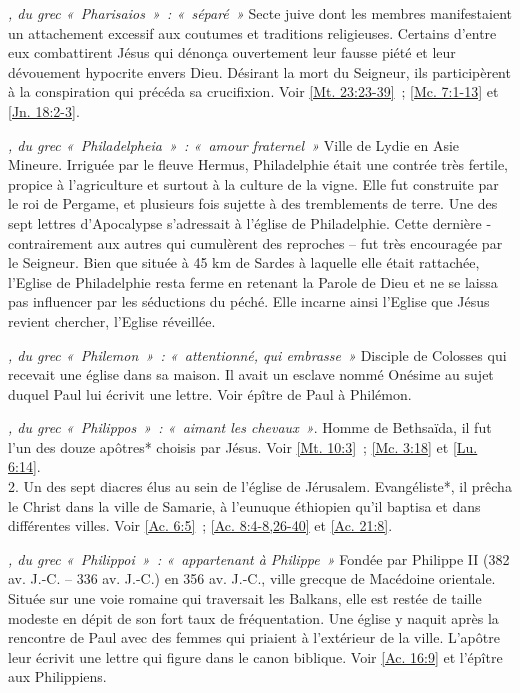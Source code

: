\begin{multicols}{2}
\textit{, du grec «~Pharisaios~»~: «~séparé~»}\newline
Secte juive dont les membres manifestaient un attachement excessif aux coutumes et traditions religieuses. Certains d'entre eux combattirent Jésus qui dénonça ouvertement leur fausse piété et leur dévouement hypocrite envers Dieu. Désirant la mort du Seigneur, ils participèrent à la conspiration qui précéda sa crucifixion. Voir \vref{Mt. 23:23-39}~; \vref{Mc. 7:1-13} et \vref{Jn. 18:2-3}.

\textit{, du grec «~Philadelpheia~»~: «~amour fraternel~»}\newline
Ville de Lydie en Asie Mineure. Irriguée par le fleuve Hermus, Philadelphie était une contrée très fertile, propice à l'agriculture et surtout à la culture de la vigne. Elle fut construite par le roi de Pergame, et plusieurs fois sujette à des tremblements de terre. Une des sept lettres d'Apocalypse s'adressait à l'église de Philadelphie. Cette dernière - contrairement aux autres qui cumulèrent des reproches – fut très encouragée par le Seigneur. Bien que située à 45 km de Sardes à laquelle elle était rattachée, l'Eglise de Philadelphie resta ferme en retenant la Parole de Dieu et ne se laissa pas influencer par les séductions du péché. Elle incarne ainsi l'Eglise que Jésus revient chercher, l'Eglise réveillée.

\textit{, du grec «~Philemon~»~: «~attentionné, qui embrasse~»}\newline
Disciple de Colosses qui recevait une église dans sa maison. Il avait un esclave nommé Onésime au sujet duquel Paul lui écrivit une lettre. Voir épître de Paul à Philémon.

\textit{, du grec «~Philippos~»~: «~aimant les chevaux~»}. Homme de Bethsaïda, il fut l'un des douze apôtres* choisis par Jésus. Voir \vref{Mt. 10:3}~; \vref{Mc. 3:18} et \vref{Lu. 6:14}.
\\2. Un des sept diacres élus au sein de l'église de Jérusalem. Evangéliste*, il prêcha le Christ dans la ville de Samarie, à l'eunuque éthiopien qu'il baptisa et dans différentes villes. Voir \vref{Ac. 6:5}~; \vref{Ac. 8:4-8,26-40} et \vref{Ac. 21:8}.

\textit{, du grec «~Philippoi~»~: «~appartenant à Philippe~»}\newline
Fondée par Philippe II (382 av. J.-C. – 336 av. J.-C.) en 356 av. J.-C., ville grecque de Macédoine orientale. Située sur une voie romaine qui traversait les Balkans, elle est restée de taille modeste en dépit de son fort taux de fréquentation. Une église y naquit après la rencontre de Paul avec des femmes qui priaient à l'extérieur de la ville. L'apôtre leur écrivit une lettre qui figure dans le canon biblique. Voir \vref{Ac. 16:9} et l'épître aux Philippiens.


\end{multicols}
